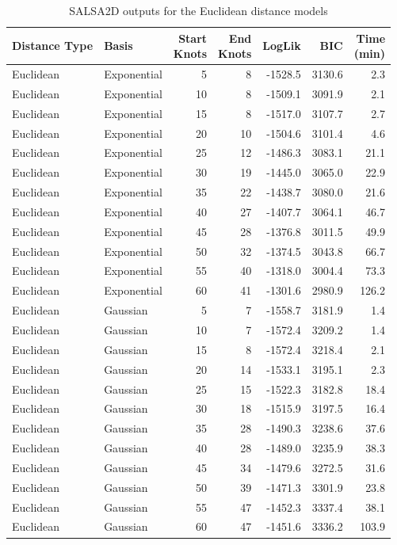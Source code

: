 \begin{table}[!htb]
\renewcommand{\arraystretch}{0.5}
\begin{tabular}{|l|l|r|r|r|r|r|}
\hline
Distance Type & Basis & \makecell[r]{Start \\Knots} & \makecell[l]{End \\Knots} & LogLik & BIC & \makecell[l]{Time \\(min)}\\
\hline
Euclidean & Exponential & 5 & 8 & -1528.5 & 3130.6 & 2.3\\
\hline
Euclidean & Exponential & 10 & 8 & -1509.1 & 3091.9 & 2.1\\
\hline
Euclidean & Exponential & 15 & 8 & -1517.0 & 3107.7 & 2.7\\
\hline
Euclidean & Exponential & 20 & 10 & -1504.6 & 3101.4 & 4.6\\
\hline
Euclidean & Exponential & 25 & 12 & -1486.3 & 3083.1 & 21.1\\
\hline
Euclidean & Exponential & 30 & 19 & -1445.0 & 3065.0 & 22.9\\
\hline
Euclidean & Exponential & 35 & 22 & -1438.7 & 3080.0 & 21.6\\
\hline
Euclidean & Exponential & 40 & 27 & -1407.7 & 3064.1 & 46.7\\
\hline
Euclidean & Exponential & 45 & 28 & -1376.8 & 3011.5 & 49.9\\
\hline
Euclidean & Exponential & 50 & 32 & -1374.5 & 3043.8 & 66.7\\
\hline
Euclidean & Exponential & 55 & 40 & -1318.0 & 3004.4 & 73.3\\
\hline
Euclidean & Exponential & 60 & 41 & -1301.6 & 2980.9 & 126.2\\
\hline
Euclidean & Gaussian & 5 & 7 & -1558.7 & 3181.9 & 1.4\\
\hline
Euclidean & Gaussian & 10 & 7 & -1572.4 & 3209.2 & 1.4\\
\hline
Euclidean & Gaussian & 15 & 8 & -1572.4 & 3218.4 & 2.1\\
\hline
Euclidean & Gaussian & 20 & 14 & -1533.1 & 3195.1 & 2.3\\
\hline
Euclidean & Gaussian & 25 & 15 & -1522.3 & 3182.8 & 18.4\\
\hline
Euclidean & Gaussian & 30 & 18 & -1515.9 & 3197.5 & 16.4\\
\hline
Euclidean & Gaussian & 35 & 28 & -1490.3 & 3238.6 & 37.6\\
\hline
Euclidean & Gaussian & 40 & 28 & -1489.0 & 3235.9 & 38.3\\
\hline
Euclidean & Gaussian & 45 & 34 & -1479.6 & 3272.5 & 31.6\\
\hline
Euclidean & Gaussian & 50 & 39 & -1471.3 & 3301.9 & 23.8\\
\hline
Euclidean & Gaussian & 55 & 47 & -1452.3 & 3337.4 & 38.1\\
\hline
Euclidean & Gaussian & 60 & 47 & -1451.6 & 3336.2 & 103.9\\
\hline
\end{tabular}
\caption{SALSA2D outputs for the Euclidean distance models\label{tab:outputseuc}}
\end{table}

